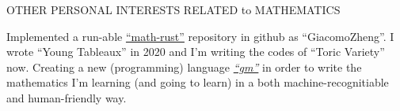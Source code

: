 \begin{rubric}{OTHER PERSONAL INTERESTS RELATED to MATHEMATICS}

	\entry* Implemented a run-able \href{https://github.com/GiacomoZheng/math-rust}{``math-rust''} repository in github as ``GiacomoZheng''. I wrote ``Young Tableaux'' in 2020 and I'm writing the codes of ``Toric Variety'' now.
	\entry* Creating a new (programming) language \href{https://github.com/GiacomoZheng/gm}{\textit{``gm''}} in order to write the mathematics I'm learning (and going to learn) in a both machine-recognitiable and human-friendly way.
\end{rubric}